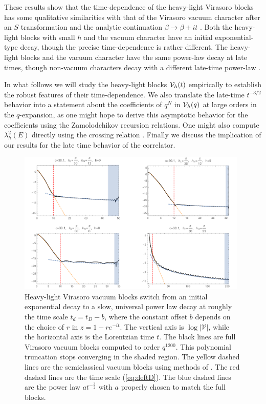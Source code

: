 These results show that the time-dependence of the heavy-light Virasoro blocks has some qualitative similarities with that of the Virasoro vacuum character after an $S$ transformation and the analytic continuation $\beta \to \beta + i t$ \cite{Dyer:2016pou}.  Both the heavy-light blocks with small $h$ and the vacuum character have an initial exponential-type decay, though the precise time-dependence is rather different.  The heavy-light blocks and the vacuum character have the same power-law decay at late times, though non-vacuum characters decay with a different late-time power-law \cite{Dyer:2016pou}.

In what follows we will study the heavy-light blocks ${\cal V}_h(t)$ empirically to establish the robust features of their time-dependence.  We also translate the late-time $t^{-3/2}$ behavior into a statement about the coefficients of $q^N$ in ${\cal V}_h(q)$ at large orders in the $q$-expansion, as one might hope to derive this asymptotic behavior for the coefficients using the Zamolodchikov recursion relations.  One might also compute $\lambda_h^2(E)$ directly using the crossing relation \cite{Ponsot:1999uf, Teschner:2003en}. Finally  we discuss the implication of our results for the  late time behavior of the correlator.


\begin{figure}[h]
\begin{centering}
\includegraphics[width=0.98\textwidth]{virasoro_chapter/VBlock}
\caption[Some heavy-light Virasoro vacuum blocks as functions of Lorentzian time]{Heavy-light Virasoro vacuum blocks switch from an initial exponential decay to a slow, universal power law decay at roughly the time scale $t_d = t_D - b$, where the constant offset $b$ depends on the choice of $r$ in $z = 1 - re^{-it}$. The vertical axis is $\log|\mathcal{V}|$, while the horizontal axis is the Lorentzian time $t$. The black lines are full Virasoro vacuum blocks computed to order $q^{1200}$. This polynomial truncation stops converging in the shaded region. The yellow dashed lines are the semiclassical vacuum blocks using methods of \cite{Fitzpatrick:2016mjq}. The red dashed lines are the time scale (\ref{eq:deftD}). The blue dashed lines are the power law $a t^{-\frac{3}{2}}$ with $a$ properly chosen to match the full blocks.  }
\label{fig:VBlock}
\end{centering}
\end{figure}

